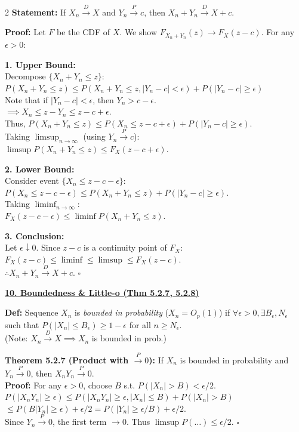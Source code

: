 \documentclass{article}
\newcommand{\sectiontitle}[1]{\vspace{0.1cm}\textbf{\underline{#1}}\vspace{0.1cm}}
\newcommand{\distname}[1]{\textbf{#1}}
\begin{document}
\begin{multicols*}{2}
\textbf{Statement:} If $X_n \xrightarrow{D} X$ and $Y_n \xrightarrow{P} c$, then $X_n + Y_n \xrightarrow{D} X+c$.

\textbf{Proof:} Let $F$ be the CDF of $X$. We show $F_{X_n+Y_n}(z) \to F_X(z-c)$. For any $\epsilon > 0$:

\textbf{1. Upper Bound:}
\\ Decompose $\{X_n + Y_n \le z\}$:
\\ $P(X_n + Y_n \le z) \le P(X_n + Y_n \le z, |Y_n - c| < \epsilon) + P(|Y_n - c| \ge \epsilon)$
\\ Note that if $|Y_n - c| < \epsilon$, then $Y_n > c - \epsilon$.
\\ $\implies X_n \le z - Y_n \le z - c + \epsilon$.
\\ Thus, $P(X_n + Y_n \le z) \le P(X_n \le z - c + \epsilon) + P(|Y_n - c| \ge \epsilon)$.
\\ Taking $\limsup_{n \to \infty}$ (using $Y_n \xrightarrow{P} c$):
\\ $\limsup P(X_n + Y_n \le z) \le F_X(z - c + \epsilon)$.

\textbf{2. Lower Bound:}
\\ Consider event $\{X_n \le z - c - \epsilon\}$:
\\ $P(X_n \le z - c - \epsilon) \le P(X_n + Y_n \le z) + P(|Y_n - c| \ge \epsilon)$.
\\ Taking $\liminf_{n \to \infty}$:
\\ $F_X(z - c - \epsilon) \le \liminf P(X_n + Y_n \le z)$.

\textbf{3. Conclusion:}
\\ Let $\epsilon \downarrow 0$. Since $z-c$ is a continuity point of $F_X$:
\\ $F_X(z-c) \le \liminf \le \limsup \le F_X(z-c)$.
\\ $\therefore X_n + Y_n \xrightarrow{D} X+c$. \hfill $\square$

\sectiontitle{10. Boundedness \& Little-o (Thm 5.2.7, 5.2.8)}

\textbf{Def:} Sequence $X_n$ is \textit{bounded in probability} ($X_n = O_p(1)$) if $\forall \epsilon > 0, \exists B_\epsilon, N_\epsilon$ such that $P(|X_n| \le B_\epsilon) \ge 1 - \epsilon$ for all $n \ge N_\epsilon$.
\\ (Note: $X_n \xrightarrow{D} X \implies X_n$ is bounded in prob.)

\distname{Theorem 5.2.7 (Product with $\xrightarrow{P} 0$):}
If $X_n$ is bounded in probability and $Y_n \xrightarrow{P} 0$, then $X_n Y_n \xrightarrow{P} 0$.
\\ \textbf{Proof:} For any $\epsilon > 0$, choose $B$ s.t. $P(|X_n| > B) < \epsilon/2$.
\\ $P(|X_n Y_n| \ge \epsilon) \le P(|X_n Y_n| \ge \epsilon, |X_n| \le B) + P(|X_n| > B)$
\\ $\le P(B |Y_n| \ge \epsilon) + \epsilon/2 = P(|Y_n| \ge \epsilon/B) + \epsilon/2$.
\\ Since $Y_n \xrightarrow{P} 0$, the first term $\to 0$. Thus $\limsup P(\dots) \le \epsilon/2$. \hfill $\square$


\end{multicols*}
\end{document}
